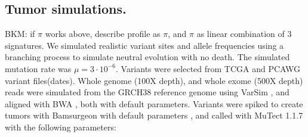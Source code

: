 \documentclass[a4,center,fleqn]{NAR}
\newcommand{\bkmcomment}[1]{{\color{blue}BKM: #1}}
\begin{document}




\subsection{Tumor simulations.}
\bkmcomment{if $\pi$ works above, describe profile as $\pi$, and $\pi$ as linear combination of 3 signatures.}
We simulated realistic variant sites and allele frequencies using a branching process to simulate neutral evolution with no death.
The simulated mutation rate was $\mu = 3\cdot10^{-6}$.
Variants were selected from TCGA and PCAWG variant files(dates).
Whole genome (100X depth), and whole exome (500X depth) reads were simulated from the GRCH38 reference genome using VarSim \cite{Mu2015}, and aligned with BWA \cite{Li2009a}, both with default parameters.
Variants were spiked to create tumors with Bamsurgeon with default parameters \cite{Ewing2015a},
and called with MuTect 1.1.7 \cite{Cibulskis2013} with the following parameters:
\end{document}
